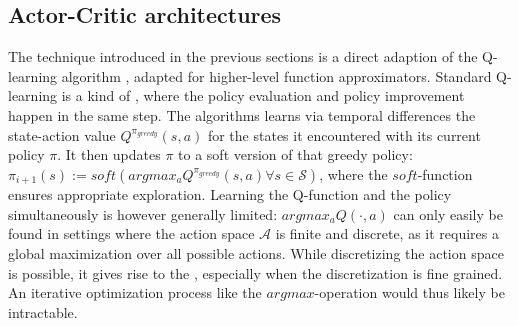 \subsection{Actor-Critic architectures}

The technique introduced in the previous sections is a direct adaption of the Q-learning algorithm \cite{sutton_learning_1988}\cite{watkins_learning_1989}, adapted for higher-level function approximators. Standard Q-learning is a kind of , where the policy evaluation and policy improvement happen in the same step. The algorithms learns via temporal differences the state-action value $Q^{\pi_{greedy}}(s,a)$ for the states it encountered with its current policy $\pi$. It then updates $\pi$ to a soft version of that greedy policy: $\pi_{i+1}(s) := soft(argmax_a Q^{\pi_{greedy}}(s,a) \forall s \in \mathcal{S})$, where the $soft$-function ensures appropriate exploration. Learning the Q-function and the policy simultaneously is however generally limited: $argmax_aQ(\cdot, a)$ can only easily be found in settings where the action space $\mathcal{A}$ is finite and discrete, as it requires a global maximization over all possible actions. While discretizing the action space is possible, it gives rise to the , especially when the discretization is fine grained. An iterative optimization process like the $argmax$-operation would thus likely be intractable.\\


